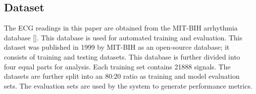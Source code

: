 \subsection{Dataset}
The ECG readings in this paper are obtained from the MIT-BIH arrhythmia database []. This database is used for automated training and evaluation. This dataset was published in 1999 by MIT-BIH as an open-source database; it consists of training and testing datasets. This database is further divided into four equal parts for analysis. {\responsemod Each training set contains 21888 signals. The datasets are further split into an 80:20 ratio as training and model evaluation sets. The evaluation sets are used by the system to generate performance metrics.}